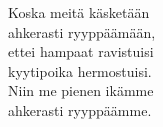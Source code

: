 
            Koska meitä käsketään \\
            ahkerasti ryyppäämään, \\
            ettei hampaat ravistuisi \\
            kyytipoika hermostuisi. \\
            Niin me pienen ikämme \\
            ahkerasti ryyppäämme. \\
